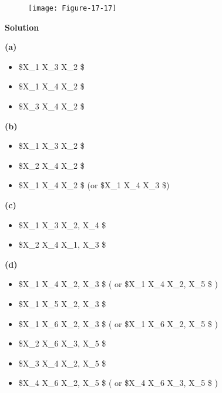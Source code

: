 \begin{figure}[H]
\texttt{[image: Figure-17-17]}
\end{figure}

\textbf{Solution}

\textbf{(a)}

\begin{itemize}[tightlist]
\item
  \$X\_1  X\_3 \textbar{} X\_2 \$
\item
  \$X\_1  X\_4 \textbar{} X\_2 \$
\item
  \$X\_3  X\_4 \textbar{} X\_2 \$
\end{itemize}

\textbf{(b)}

\begin{itemize}[tightlist]
\item
  \$X\_1  X\_3 \textbar{} X\_2 \$
\item
  \$X\_2  X\_4 \textbar{} X\_2 \$
\item
  \$X\_1  X\_4 \textbar{} X\_2 \$ (or \$X\_1  X\_4
  \textbar{} X\_3 \$)
\end{itemize}

\textbf{(c)}

\begin{itemize}[tightlist]
\item
  \$X\_1  X\_3 \textbar{} X\_2, X\_4 \$
\item
  \$X\_2  X\_4 \textbar{} X\_1, X\_3 \$
\end{itemize}

\textbf{(d)}

\begin{itemize}[tightlist]
\item
  \$X\_1  X\_4 \textbar{} X\_2, X\_3 \$ ( or \$X\_1 
  X\_4 \textbar{} X\_2, X\_5 \$ )
\item
  \$X\_1  X\_5 \textbar{} X\_2, X\_3 \$
\item
  \$X\_1  X\_6 \textbar{} X\_2, X\_3 \$ ( or \$X\_1 
  X\_6 \textbar{} X\_2, X\_5 \$ )
\item
  \$X\_2  X\_6 \textbar{} X\_3, X\_5 \$
\item
  \$X\_3  X\_4 \textbar{} X\_2, X\_5 \$
\item
  \$X\_4  X\_6 \textbar{} X\_2, X\_5 \$ ( or \$X\_4 
  X\_6 \textbar{} X\_3, X\_5 \$ )
\end{itemize}

